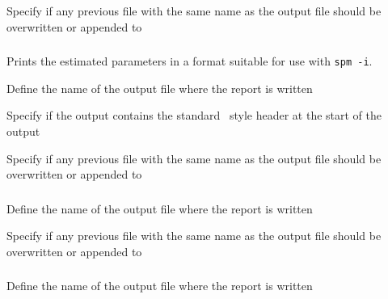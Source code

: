 {Specify if any previous file with the same name as the output file should be overwritten or appended to}

\subsubsection[Printing the estimated parameter values out as a vector]{\label{sec:InputFileFormat}}

Prints the estimated parameters in a format suitable for use with \texttt{spm -i}.

 {Define the name of the output file where the report is written}

 {Specify if the output contains the standard \SPM\ style header at the start of the output}

 {Specify if any previous file with the same name as the output file should be overwritten or appended to}

\subsubsection[Print the objective function values]{}

 {Define the name of the output file where the report is written}

 {Specify if any previous file with the same name as the output file should be overwritten or appended to}

\subsubsection[Print the covariance matrix]{}

 {Define the name of the output file where the report is written}

